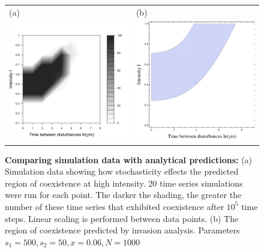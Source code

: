 \documentclass[a4paper]{article}
\begin{document}
\begin{figure}\begin{tabular}{ll}
(a)&(b)\\
 \includegraphics[width=2.5in]{simcoexist.pdf}& \includegraphics[width=2.5in]{hockeyTd.pdf}\end{tabular}
   \caption[Comparing simulation data with analytical predictions]{\textbf{Comparing simulation data with analytical predictions:} (a) Simulation data showing how stochasticity effects the predicted region of coexistence at high intensity. 20 time series simulations were run for each point. The darker the shading, the greater the number of these time series that exhibited coexistence after $10^5$ time steps. Linear scaling is performed between data points. (b) The region of coexistence predicted by invasion analysis. Parameters $s_1=500,s_2=50,x=0.06,N=1000$}
 \label{fig:simulationdata}
\end{figure}



   
\end{document}
